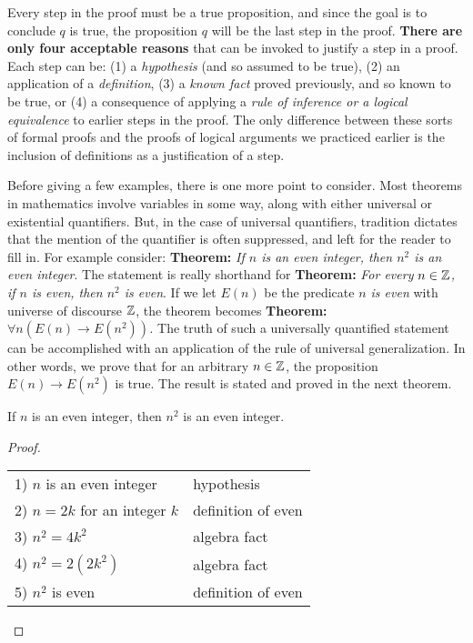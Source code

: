 Every step in the proof must be a true proposition, and since the goal is to conclude $q$ is true,
 the proposition $q$ will be the last step in the proof.
{\bfseries There are only  four acceptable reasons} that can be invoked to
 justify a step in a proof.
Each step can be: (1) a {\itshape hypothesis} (and so assumed to be true), (2) an application of
a {\itshape definition}, (3) a {\itshape known fact} proved previously, and so known to be true,
 or (4) a consequence
of applying a {\itshape rule of inference  or a logical equivalence} to 
earlier steps in the proof.
The only difference between these sorts of formal proofs and the proofs of logical
arguments we practiced earlier is the inclusion of definitions as a justification
of a step.

Before giving a few examples, there is one more point to consider. Most theorems in
 mathematics involve variables in some
way, along with either universal or existential quantifiers. But, in the case of universal quantifiers,
 tradition dictates
that the mention of the quantifier is often  suppressed, and left for the reader to fill in.
For example consider: {\bfseries Theorem:} {\itshape If $n$ is an even integer, then $n^2$ is an even integer}.
The statement is really shorthand for 
{\bfseries Theorem:} {\itshape For every $n\in \mathbb{Z}$, if $n$ is even, then $n^2$ is even}.
If we let $E(n)$ be the predicate {\itshape $n$ is even} with universe of discourse $\mathbb{Z}$, the
 theorem becomes  
{\bfseries Theorem:} {\itshape $\forall{n} (E(n)\to E(n^2))$.} The truth of such a universally quantified 
statement can be
accomplished with an application of the rule of universal generalization. In other words, we 
prove that for an arbitrary $n\in\mathbb{Z}$, the proposition $E(n)\to E(n^2)$ is true.
The result is stated and proved in the next theorem.

\clearpage
\begin{thm}
If $n$ is an even integer, then $n^2$ is an even integer.
\begin{proof}
 \begin{table*}
 \begin{tabular}{p{5cm} l}
1) $n$ is an even integer    & hypothesis \\
2) $n=2k$ for an integer $k$ & definition of even \\
3) $n^2 = 4k^2$              & algebra fact \\
4) $n^2 = 2(2k^2)$           & algebra fact \\
5) $n^2$ is even             & definition of even
 \end{tabular}
\end{table*}
\end{proof}
\end{thm}


